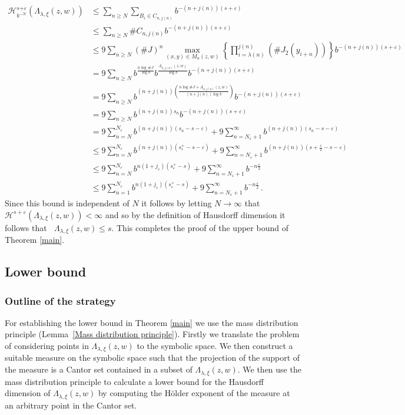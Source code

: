 \documentclass[12pt]{article}
\theoremstyle{remark}
\numberwithin{equation}{section}
\newcommand{\cH}{{\mathcal H}}
\newcommand{\0}{\mathbf{0}}
\DeclareMathOperator{\dimh}{\dim_H}
\begin{document}
 
 \begin{align*}
     \cH_{b^{-N}}^{s{+\varepsilon}}(\Lambda_{\lambda,\xi}(z,w)) &\leq \sum_{n \geq N} \sum_{B_{i} \in C_{n,j(n)}} b^{-(n+j(n))(s+\varepsilon)} \\
     & \leq \sum_{n\geq N} \# C_{n,j(n)} b^{-(n+j(n))(s+\varepsilon)}\\
     & \leq 9\sum_{n\geq N} (\#J)^{n} \max_{(x,y) \in M_{n}(z,w)} \left\{\prod_{i=\lambda(n)}^{j(n)}(\#J_{2}(y_{i+n})) \right\}  b^{-(n+j(n))(s+\varepsilon)}\\
     &= 9\sum_{n \geq N} b^{\frac{n\log \#J}{\log b}} b^{\frac{A_{n,j(n)}(z,w)}{\log b}} b^{-(n+j(n))(s+\varepsilon)} \\
     &{= 9\sum_{n \geq N} b^{(n+j(n))\left(\frac{n\log \#J + A_{n,j(n)}(z,w)}{(n+j(n))\log b}\right)} b^{-(n+j(n))(s+\varepsilon)}} \\
     &{= 9\sum_{n \geq N} b^{(n+j(n))s_n} b^{-(n+j(n))(s+\varepsilon)}} \\
     &{= 9 \sum_{n=N}^{N_{\varepsilon}}{b^{(n+j(n))(s_n-s-\varepsilon)}} + 9 \sum_{n=N_{\varepsilon}+1}^{\infty}{b^{(n+j(n))(s_n - s - \varepsilon)}}} \\
     &{\leq 9 \sum_{n=N}^{N_{\varepsilon}}{b^{(n+j(n))(s^{+}_{\varepsilon}-s-\varepsilon)}} + 9 \sum_{n=N_{\varepsilon}+1}^{\infty}{b^{(n+j(n))\left(s+\frac{\varepsilon}{2}-s-\varepsilon \right)}}} \\
     &{\leq 9 \sum_{n=N}^{N_{\varepsilon}}{b^{n(1+j_{\varepsilon})(s^{+}_{\varepsilon}-s)}} + 9 \sum_{n=N_{\varepsilon}+1}^{\infty}{b^{-n\frac{\varepsilon}{2}}}} \\
     &{\leq 9 \sum_{n=1}^{N_{\varepsilon}}{b^{n(1+j_{\varepsilon})(s^{+}_{\varepsilon}-s)}} + 9 \sum_{n=N_{\varepsilon}+1}^{\infty}{b^{-n\frac{\varepsilon}{2}}}}\, .
 \end{align*}
 Since this bound is independent of $N$ it follows by letting $N\to \infty$ that \mbox{$\cH^{s+\varepsilon}(\Lambda_{\lambda,\xi}(z,w))<\infty$} and so by the definition of Hausdorff dimension it follows that \mbox{$\dimh \Lambda_{\lambda,\xi}(z,w) \leq s$}. {This completes the proof of} the upper bound {of Theorem \ref{main}}.
 
 \subsection{Lower bound} \label{lowerbound}
  
 \subsubsection{Outline of the strategy}
 For establishing the lower bound in Theorem \ref{main} we use the mass distribution principle (Lemma~\ref{Mass distribution principle}). Firstly we translate the problem of considering points in $\Lambda_{\lambda,\xi}(z,w)$ to the symbolic space. We then construct a suitable measure on the symbolic space such that the projection of the support of the measure is a Cantor set contained in a subset of $\Lambda_{\lambda,\xi}(z,w)$. We then use the mass distribution principle to calculate a lower bound for the Hausdorff dimension of $\Lambda_{\lambda,\xi}(z,w)$ by computing the H\"{o}lder exponent of the measure at an arbitrary point in the Cantor set.
  
\end{document}
